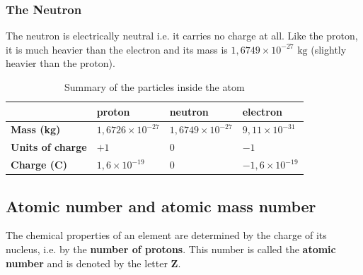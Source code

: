             \subsubsection*{The Neutron}
            \nopagebreak
          \label{m38745*id254468}The neutron is electrically neutral i.e. it carries no charge at all.
Like the proton, it is much heavier than the electron and its mass is $1,6749 \times {10}^{-27} \text{ kg}$ (slightly heavier than the proton).\par 
\label{m38745*notfhsst!!!underscore!!!id214}
          \begin{table}[H]
        \begin{center}
      \label{m38745*uid14}
    \noindent
      \begin{tabular}{|l|l|l|l|}\hline
         &
                    \textbf{proton}
                   &
                    \textbf{neutron}
                   &
                    \textbf{electron} \\ \hline
                    \textbf{Mass (kg)}
                   &
        $1,6726 \times {10}^{-27}$ &
        $1,6749 \times {10}^{-27}$ &
        $9,11 \times {10}^{-31}$ \\ \hline
                    \textbf{Units of charge}
                   &
        $+1$ &
        $0$ &
        $-1$ \\ \hline
                    \textbf{Charge (C)}
                   &
        $1,6 \times {10}^{-19}$ &
        $0$ &
        $-1,6 \times {10}^{-19}$ \\ \hline
    \end{tabular}
      \end{center}
    \caption{Summary of the particles inside the atom}
\end{table}
    \par
    \label{m38745*cid5}
            \subsection*{Atomic number and atomic mass number}
            \nopagebreak
      \label{m38745*id255805}The chemical properties of an element are determined by the charge of its nucleus, i.e. by the \textbf{number of protons}. This number is called the \textbf{atomic number} and is denoted by the letter \textbf{Z}.

